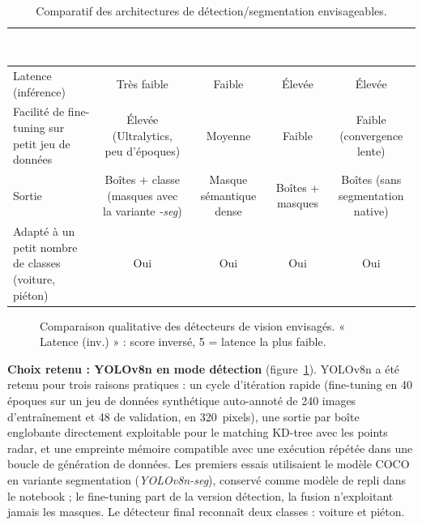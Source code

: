 \documentclass[12pt,a4paper,titlepage]{article}
\newcommand{\hd}[1]{\textcolor{white}{\textbf{#1}}}
\begin{document}
\begin{table}[H]
    \centering
    \caption{Comparatif des architectures de détection/segmentation envisageables.}
    \begin{tabularx}{\textwidth}{F{3.2cm}CCCC}
        \toprule
        \hd{Critère} & \hd{YOLOv8 (retenu)} & \hd{SegFormer} & \hd{Mask R-CNN} & \hd{DETR} \\
        \midrule
        Latence (inférence) & Très faible & Faible & Élevée & Élevée \\
        Facilité de fine-tuning sur petit jeu de données & Élevée (Ultralytics, peu d'époques) & Moyenne & Faible & Faible (convergence lente) \\
        Sortie & Boîtes + classe (masques avec la variante \textit{-seg}) & Masque sémantique dense & Boîtes + masques & Boîtes (sans segmentation native) \\
        Adapté à un petit nombre de classes (voiture, piéton) & Oui & Oui & Oui & Oui \\
        \bottomrule
    \end{tabularx}
\end{table}

\begin{figure}[H]
    \centering
    \caption{Comparaison qualitative des détecteurs de vision envisagés. « Latence (inv.) » : score inversé, 5 = latence la plus faible.}
    \label{fig:chart_detecteur}
\end{figure}

\textbf{Choix retenu : YOLOv8n en mode détection} (figure~\ref{fig:chart_detecteur}). YOLOv8n a été retenu pour trois raisons pratiques : un cycle d'itération rapide (fine-tuning en 40 époques sur un jeu de données synthétique auto-annoté de 240 images d'entraînement et 48 de validation, en 320~pixels), une sortie par boîte englobante directement exploitable pour le matching KD-tree avec les points radar, et une empreinte mémoire compatible avec une exécution répétée dans une boucle de génération de données. Les premiers essais utilisaient le modèle COCO en variante segmentation (\textit{YOLOv8n-seg}), conservé comme modèle de repli dans le notebook ; le fine-tuning part de la version détection, la fusion n'exploitant jamais les masques. Le détecteur final reconnaît deux classes : voiture et piéton.
\end{document}
